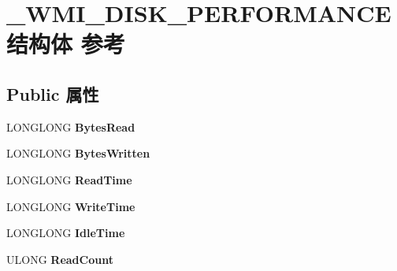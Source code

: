 \hypertarget{struct___w_m_i___d_i_s_k___p_e_r_f_o_r_m_a_n_c_e}{}\section{\+\_\+\+W\+M\+I\+\_\+\+D\+I\+S\+K\+\_\+\+P\+E\+R\+F\+O\+R\+M\+A\+N\+C\+E结构体 参考}
\label{struct___w_m_i___d_i_s_k___p_e_r_f_o_r_m_a_n_c_e}
\subsection*{Public 属性}
\begin{DoxyCompactItemize}
\item 
\mbox{\label{struct___w_m_i___d_i_s_k___p_e_r_f_o_r_m_a_n_c_e_af4ddeb7d890949e824dfce1d6a3ecbc7}} 
L\+O\+N\+G\+L\+O\+NG {\bfseries Bytes\+Read}
\item 
\mbox{\label{struct___w_m_i___d_i_s_k___p_e_r_f_o_r_m_a_n_c_e_a28c318a893fc16182edd311744197c50}} 
L\+O\+N\+G\+L\+O\+NG {\bfseries Bytes\+Written}
\item 
\mbox{\label{struct___w_m_i___d_i_s_k___p_e_r_f_o_r_m_a_n_c_e_a39d71f99809f7fa5fe4af7b51a9e4221}} 
L\+O\+N\+G\+L\+O\+NG {\bfseries Read\+Time}
\item 
\mbox{\label{struct___w_m_i___d_i_s_k___p_e_r_f_o_r_m_a_n_c_e_a1406af291a874eed0066e7716c24092a}} 
L\+O\+N\+G\+L\+O\+NG {\bfseries Write\+Time}
\item 
\mbox{\label{struct___w_m_i___d_i_s_k___p_e_r_f_o_r_m_a_n_c_e_af987574b2da34542755be09ea3185f11}} 
L\+O\+N\+G\+L\+O\+NG {\bfseries Idle\+Time}
\item 
\mbox{\label{struct___w_m_i___d_i_s_k___p_e_r_f_o_r_m_a_n_c_e_a4a9fa149d7af0839e8bb09d80750a366}} 
U\+L\+O\+NG {\bfseries Read\+Count}
\item 
\mbox{\label{struct___w_m_i___d_i_s_k___p_e_r_f_o_r_m_a_n_c_e_a41aee654b985e60598b4ea8125722955}} 

\end{DoxyCompactItemize}
